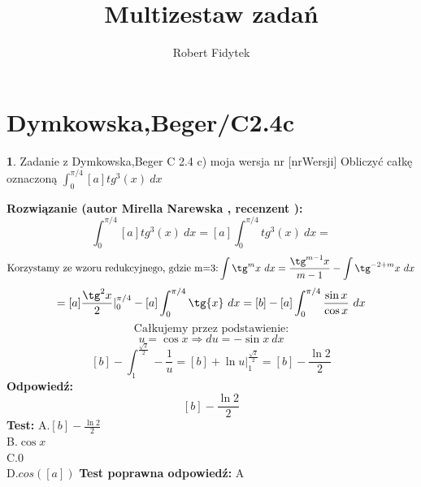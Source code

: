 \documentclass[12pt, a4paper]{article}
\title{Multizestaw zadań}
\author{Robert Fidytek}
\date{}
\theoremstyle{definition} %
\newtheorem{zad}{}
\newcommand{\kategoria}[1]{\section{#1}} %
\newcommand{\zadStart}[1]{\begin{zad}#1\newline} %
\newcommand{\zadStop}{\end{zad}}   %
\newcommand{\rozwStart}[2]{\noindent \textbf{Rozwiązanie (autor #1 , recenzent #2): }\newline} %
\newcommand{\odpStart}{\noindent \textbf{Odpowiedź:}\newline}    %
\newcommand{\odpStop}{\newline}                                             %
\newcommand{\testStart}{\noindent \textbf{Test:}\newline} %
\newcommand{\testStop}{\newline} %
\newcommand{\kluczStart}{\noindent \textbf{Test poprawna odpowiedź:}\newline} %
\newcommand{\kluczStop}{\newline} %
\begin{document}
\maketitle



\kategoria{Dymkowska,Beger/C2.4c}
\zadStart{Zadanie z Dymkowska,Beger C 2.4 c) moja wersja nr [nrWersji]}
Obliczyć całkę oznaczoną $\displaystyle \int_{0}^{\pi/4} [a]tg^3(x) \ dx $
\zadStop
\rozwStart{Mirella Narewska}{}
$$\int_{0}^{\pi/4} [a]tg^3(x) \ dx = [a] \int_{0}^{\pi/4} tg^3(x) \ dx= $$
$$\text{Korzystamy ze wzoru redukcyjnego, gdzie m=3:}\int \tg^m{x} \ dx=\frac{\tg^{m-1}{x}}{m-1} -\int \tg^{-2+m}{x} \ dx$$
$$=[a]\frac{\tg^2{x}}{2}|_{0}^{\pi/4}-[a]\int_{0}^{\pi/4} \tg{x} \ dx=[b]-[a]\int_{0}^{\pi/4} \frac{\sin{x}}{\cos{x}} \ dx$$
$$\text{Całkujemy przez podstawienie:}$$
$$u=\cos{x} \Rightarrow du=-\sin{x} \ dx$$
$$[b]-\int_{1}^{\frac{\sqrt{2}}{2}} -\frac{1}{u}=[b]+\ln{u}|_{1}^{\frac{\sqrt{2}}{2}}=[b]-\frac{\ln{2}}{2}$$
\odpStart
$$[b]-\frac{\ln{2}}{2}$$
\odpStop
\testStart
A.$[b]-\frac{\ln{2}}{2}$
\\
B.$\cos{x}$
\\
C.$0$
\\
D.$cos([a])$
\testStop
\kluczStart
A
\kluczStop
\end{document}
